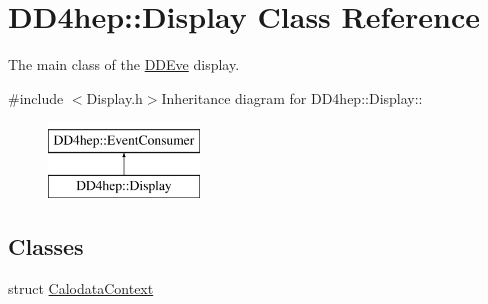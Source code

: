 \hypertarget{class_d_d4hep_1_1_display}{
\section{DD4hep::Display Class Reference}
\label{class_d_d4hep_1_1_display}
}


The main class of the \hyperlink{struct_d_d4hep_1_1_d_d_eve}{DDEve} display.  


{\ttfamily \#include $<$Display.h$>$}Inheritance diagram for DD4hep::Display::\begin{figure}[H]
\begin{center}
\leavevmode
\includegraphics[height=2cm]{class_d_d4hep_1_1_display}
\end{center}
\end{figure}
\subsection*{Classes}
\begin{DoxyCompactItemize}
\item 
struct \hyperlink{struct_d_d4hep_1_1_display_1_1_calodata_context}{CalodataContext}
\end{DoxyCompactItemize}
